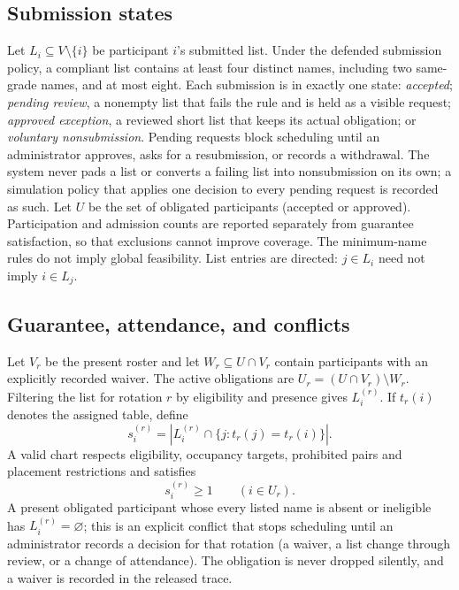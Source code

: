 \documentclass[11pt,a4paper]{article}
\theoremstyle{definition}\newtheorem{definition}[theorem]{Definition}
\theoremstyle{remark}\newtheorem{remark}[theorem]{Remark}
\begin{document}
\subsection{Submission states}
Let $L_i\subseteq V\setminus\{i\}$ be participant $i$'s submitted list. Under the defended submission policy, a compliant list contains at least four distinct names, including two same-grade names, and at most eight. Each submission is in exactly one state: \emph{accepted}; \emph{pending review}, a nonempty list that fails the rule and is held as a visible request; \emph{approved exception}, a reviewed short list that keeps its actual obligation; or \emph{voluntary nonsubmission}. Pending requests block scheduling until an administrator approves, asks for a resubmission, or records a withdrawal. The system never pads a list or converts a failing list into nonsubmission on its own; a simulation policy that applies one decision to every pending request is recorded as such. Let $U$ be the set of obligated participants (accepted or approved). Participation and admission counts are reported separately from guarantee satisfaction, so that exclusions cannot improve coverage. The minimum-name rules do not imply global feasibility. List entries are directed: $j\in L_i$ need not imply $i\in L_j$.

\subsection{Guarantee, attendance, and conflicts}
Let $V_r$ be the present roster and let $W_r\subseteq U\cap V_r$ contain participants with an explicitly recorded waiver. The active obligations are $U_r=(U\cap V_r)\setminus W_r$. Filtering the list for rotation $r$ by eligibility and presence gives $L_i^{(r)}$. If $t_r(i)$ denotes the assigned table, define
\begin{equation}
 s_i^{(r)}=\left|L_i^{(r)}\cap\{j:t_r(j)=t_r(i)\}\right|.
\end{equation}
A valid chart respects eligibility, occupancy targets, prohibited pairs and placement restrictions and satisfies
\begin{equation}\label{eq:guarantee}
 s_i^{(r)}\ge1\qquad(i\in U_r).
\end{equation}
A present obligated participant whose every listed name is absent or ineligible has $L_i^{(r)}=\varnothing$; this is an explicit conflict that stops scheduling until an administrator records a decision for that rotation (a waiver, a list change through review, or a change of attendance). The obligation is never dropped silently, and a waiver is recorded in the released trace.
\end{document}
